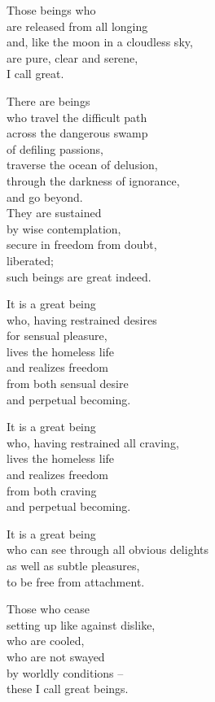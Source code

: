 Those beings who\\
are released from all longing\\
and, like the moon in a cloudless sky,\\
are pure, clear and serene,\\
I call great.


There are beings\\
who travel the difficult path\\
across the dangerous swamp\\
of defiling passions,\\
traverse the ocean of delusion,\\
through the darkness of ignorance,\\
and go beyond.\\
They are sustained\\
by wise contemplation,\\
secure in freedom from doubt,\\
liberated;\\
such beings are great indeed.


It is a great being\\
who, having restrained desires\\
for sensual pleasure,\\
lives the homeless life\\
and realizes freedom\\
from both sensual desire\\
and perpetual becoming.


It is a great being\\
who, having restrained all craving,\\
lives the homeless life\\
and realizes freedom\\
from both craving\\
and perpetual becoming.


It is a great being\\
who can see through all obvious delights\\
as well as subtle pleasures,\\
to be free from attachment.


Those who cease\\
setting up like against dislike,\\
who are cooled,\\
who are not swayed\\
by worldly conditions --\\
these I call great beings.


